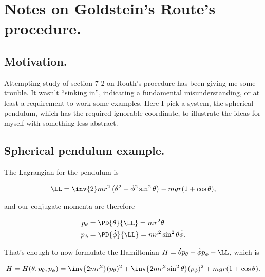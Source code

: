 %


\chapter{Notes on Goldstein's Route's procedure.}
\label{chap:goldsteinRouth}
{}
\date{Mar 3, 2010}

\beginArtNoToc

\section{Motivation.}

Attempting study of \cite{goldstein1951cm} section 7-2 on Routh's procedure has been giving me some trouble.  It wasn't ``sinking in'', indicating a fundamental misunderstanding, or at least a requirement to work some examples.  Here I pick a system, the spherical pendulum, which has the required ignorable coordinate, to illustrate the ideas for myself with something less abstract.

\section{Spherical pendulum example.}

The Lagrangian for the pendulum is

\begin{align}\label{eqn:goldsteinRouth:1}
\LL = \inv{2} m r^2 \left( \dot{\theta}^2 + \dot{\phi}^2 \sin^2 \theta \right) - m g r ( 1 + \cos\theta ),
\end{align}

and our conjugate momenta are therefore

\begin{align}\label{eqn:goldsteinRouth:2}
p_\theta &= \PD{\dot{\theta}}{\LL} = m r^2 \dot{\theta} \\
p_\phi &= \PD{\dot{\phi}}{\LL} = m r^2 \sin^2\theta \dot{\phi}.
\end{align}

That's enough to now formulate the Hamiltonian $H = \dot{\theta} p_\theta + \dot{\phi} p_\phi - \LL$, which is

\begin{align}\label{eqn:goldsteinRouth:3}
H = H(\theta, p_\theta, p_\phi) = \inv{2 m r^2 } (p_\theta)^2 + \inv{2 m r^2 \sin^2\theta} (p_\phi)^2 + m g r ( 1 + \cos\theta ).
\end{align}

